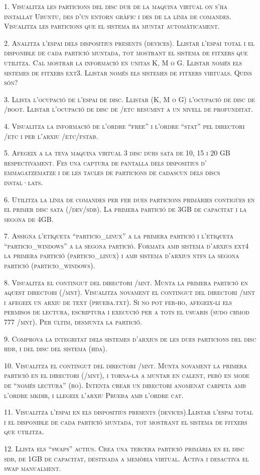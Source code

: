 \documentclass[a4paper,12pt]{article}
\begin{document}



\newpage
\textsc{1. Visualitza les particions del disc dur de la maquina virtual on s'ha instal\textperiodcentered lat Ubuntu, des d'un entorn gràfic i des de la línia de comandes. Visualitza les particions que el sistema ha muntat automàticament.}

\newpage
\textsc{2. Analitza l'espai dels dispositius presents (devices). Llistar l'espai total i el disponible de cada partició muntada, tot mostrant el sistema de fitxers que utilitza. Cal mostrar la informació en unitas K, M o G. Llistar només els sistemes de fitxers ext3. Llistar només els sistemes de fitxers virtuals. Quins són?}

\newpage
\textsc{3. Llista l'ocupació de l'espai de disc. Llistar (K, M o G) l'ocupació de disc de /boot. Llistar l'ocupació de disc de /etc resumint a un nivell de profunditat.}

\newpage
\textsc{4. Visualitza la informació de l'ordre “free” i l'ordre “stat” pel directori /etc i per l'arxiu /etc/fstab.}

\newpage
\textsc{5. Afegeix a la teva maquina virtual 3 disc durs sata de 10, 15 i 20 GB respectivament. Fes una captura de pantalla dels dispositius d' emmagatzematze i de les taules de particions de cadascun dels discs instal·lats.}

\newpage
\textsc{6. Utilitza la línia de comandes per fer dues particions primàries contigües en el primer disc sata (/dev/sdb). La primera partició de 3GB de capacitat i la segona de 4GB.}

\newpage
\textsc{7. Assigna l'etiqueta “particio\_linux” a la primera partició i l'etiqueta “particio\_windows” a la segona partició. Formata amb sistema d'arxius ext4 la primera partició (particio\_linux) i amb sistema d'arxius ntfs la segona partició (particio\_windows).}

\newpage
\textsc{8. Visualitza el contingut del directori /mnt. Munta la primera partició en aquest directori (/mnt). Visualitza novament el contingut del directori /mnt i afegeix un arxiu de text (prueba.txt). Si no pot fer-ho, afegeix-li els permisos de lectura, escriptura i execució per a tots el usuaris (sudo chmod 777 /mnt). Per últim, desmunta la partició.}

\newpage
\textsc{9. Comprova la integritat dels sistemes d'arxius de les dues particions del disc hdb, i del disc del sistema (hda).}

\newpage
\textsc{10. Visualitza el contingut del directori /mnt. Munta novament la primera partició en el directori (/mnt), i torna-la a muntar en calent, però en mode de “només lectura” (ro). Intenta crear un directori anomenat carpeta amb l'ordre mkdir, i llegeix l'arxiu Prueba amb l'ordre cat.}

\newpage
\textsc{11. Visualitza l'espai en els dispositius presents (devices).Llistar l'espai total i el disponible de cada partició muntada, tot mostrant el sistema de fitxers que utilitza.}

\newpage
\textsc{12. Llista els “swaps” actius. Crea una tercera partició primària en el disc sdb, de 1GB de capacitat, destinada a memòria virtual. Activa i desactiva el swap manualment.}
\end{document}

